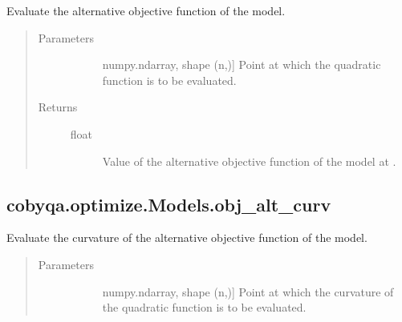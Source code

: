 \documentclass[letterpaper,10pt,english]{sphinxmanual}
\begin{document}
\begin{fulllineitems}
\begin{fulllineitems}
\label{\detokenize{refs/generated/cobyqa.optimize.Models.obj_alt:cobyqa.optimize.Models.obj_alt}}
\sphinxAtStartPar
Evaluate the alternative objective function of the model.
\begin{quote}\begin{description}
\item[{Parameters}] \leavevmode\begin{description}
\item[{}] \leavevmode{[}numpy.ndarray, shape (n,){]}
\sphinxAtStartPar
Point at which the quadratic function is to be evaluated.

\end{description}

\item[{Returns}] \leavevmode\begin{description}
\item[{float}] \leavevmode
\sphinxAtStartPar
Value of the alternative objective function of the model at .

\end{description}

\end{description}\end{quote}

\end{fulllineitems}



\subsection{cobyqa.optimize.Models.obj\_alt\_curv}
\label{\detokenize{refs/generated/cobyqa.optimize.Models.obj_alt_curv:cobyqa-optimize-models-obj-alt-curv}}\label{\detokenize{refs/generated/cobyqa.optimize.Models.obj_alt_curv::doc}}

\begin{fulllineitems}
\label{\detokenize{refs/generated/cobyqa.optimize.Models.obj_alt_curv:cobyqa.optimize.Models.obj_alt_curv}}
\sphinxAtStartPar
Evaluate the curvature of the alternative objective function of the
model.
\begin{quote}\begin{description}
\item[{Parameters}] \leavevmode\begin{description}
\item[{}] \leavevmode{[}numpy.ndarray, shape (n,){]}
\sphinxAtStartPar
Point at which the curvature of the quadratic function is to be
evaluated.


\end{description}
\end{description}
\end{quote}
\end{fulllineitems}
\end{fulllineitems}
\end{document}
